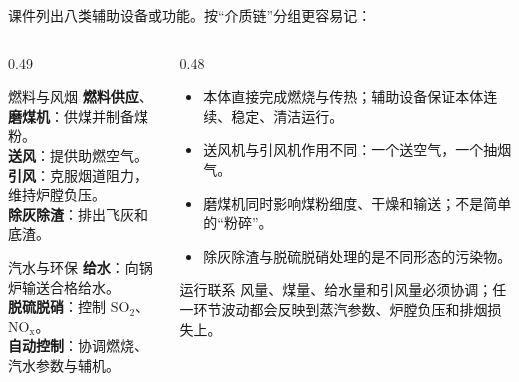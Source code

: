 \begin{frame}[t,shrink]{}
课件列出八类辅助设备或功能。按“介质链”分组更容易记：
\begin{columns}[T,onlytextwidth]
\begin{column}{0.49\textwidth}
  \begin{keybox}{燃料与风烟}
  \small
  \textbf{燃料供应}、\textbf{磨煤机}：供煤并制备煤粉。\\
  \textbf{送风}：提供助燃空气。\\
  \textbf{引风}：克服烟道阻力，维持炉膛负压。\\
  \textbf{除灰除渣}：排出飞灰和底渣。
  \end{keybox}
  \vspace{0.8mm}
  \begin{keybox}{汽水与环保}
  \small
  \textbf{给水}：向锅炉输送合格给水。\\
  \textbf{脱硫脱硝}：控制 \(\mathrm{SO_2}\)、\(\mathrm{NO_x}\)。\\
  \textbf{自动控制}：协调燃烧、汽水参数与辅机。
  \end{keybox}
\end{column}
\begin{column}{0.48\textwidth}
  \begin{itemize}
    \item 本体直接完成燃烧与传热；辅助设备保证本体连续、稳定、清洁运行。
    \item 送风机与引风机作用不同：一个送空气，一个抽烟气。
    \item 磨煤机同时影响煤粉细度、干燥和输送；不是简单的“粉碎”。
    \item 除灰除渣与脱硫脱硝处理的是不同形态的污染物。
  \end{itemize}
  \vspace{0.5mm}
  \begin{amberbox}{运行联系}
  \small 风量、煤量、给水量和引风量必须协调；任一环节波动都会反映到蒸汽参数、炉膛负压和排烟损失上。
  \end{amberbox}
\end{column}
\end{columns}
\end{frame}

